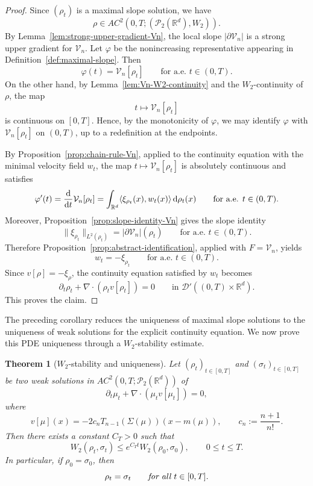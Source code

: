 \documentclass[11pt,reqno]{amsart}
\numberwithin{figure}{section}
\def\d {{\partial}}
\def\d{\mathrm{d}}
\renewcommand{\d}{  {\textup{d}} }
\newtheorem{theorem}{Theorem}[section]
\begin{document}
\begin{proof}
	Since $(\rho_t)$ is a maximal slope solution, we have
	\[
	\rho\in AC^2(0,T;(\mathcal P_2(\mathbb R^d),W_2)).
	\]
	By Lemma~\ref{lem:strong-upper-gradient-Vn}, the local slope
	$|\partial \mathcal V_n|$ is a strong upper gradient for $\mathcal V_n$.
	Let $\varphi$ be the nonincreasing representative appearing in
	Definition~\ref{def:maximal-slope}. Then
	\[
	\varphi(t)=\mathcal V_n[\rho_t]
	\qquad\text{for a.e. }t\in(0,T).
	\]
	On the other hand, by Lemma~\ref{lem:Vn-W2-continuity} and the
	$W_2$-continuity of $\rho$, the map
	\[
	t\longmapsto \mathcal V_n[\rho_t]
	\]
	is continuous on $[0,T]$. Hence, by the monotonicity of $\varphi$, we may
	identify $\varphi$ with $\mathcal V_n[\rho_t]$ on $(0,T)$, up to a redefinition at the endpoints.

	By Proposition~\ref{prop:chain-rule-Vn}, applied to the continuity equation
	with the minimal velocity field $w_t$, the map
	$t\mapsto \mathcal V_n[\rho_t]$ is absolutely continuous and satisfies
	\[
	\varphi'(t)
	=
	\frac{\d}{\d t}\mathcal V_n[\rho_t]
	=
	\int_{\mathbb R^d}
	\langle \xi_{\rho_t}(x),w_t(x)\rangle\,\d\rho_t(x)
	\qquad\text{for a.e. }t\in(0,T).
	\]
	Moreover, Proposition~\ref{prop:slope-identity-Vn} gives the slope identity
	\[
	\|\xi_{\rho_t}\|_{L^2(\rho_t)}
	=
	|\partial \mathcal V_n|(\rho_t)
	\qquad\text{for a.e. }t\in(0,T).
	\]
	Therefore Proposition~\ref{prop:abstract-identification}, applied with
	$F=\mathcal V_n$, yields
	\[
	w_t=-\xi_{\rho_t}
	\qquad\text{for a.e. }t\in(0,T).
	\]
	Since $v[\rho]=-\xi_\rho$, the continuity equation satisfied by $w_t$
	becomes
	\[
	\partial_t\rho_t+\nabla\cdot(\rho_t v[\rho_t])=0
	\qquad\text{in }\mathcal D'((0,T)\times\mathbb R^d).
	\]
	This proves the claim.
\end{proof}

The preceding corollary reduces the uniqueness of maximal slope solutions to
the uniqueness of weak solutions for the explicit continuity equation. We now
prove this PDE uniqueness through a $W_2$-stability estimate.


\begin{theorem}[$W_2$-stability and uniqueness]\label{thm:W2-stability-uniqueness}
Let $(\rho_t)_{t\in[0,T]}$ and $(\sigma_t)_{t\in[0,T]}$ be two weak solutions in
$AC^2(0,T;\mathcal P_2(\mathbb R^d))$ of
\[
\partial_t\mu_t+\nabla\cdot(\mu_t v[\mu_t])=0,
\]
where
\[
v[\mu](x)
=
-2c_nT_{n-1}(\Sigma(\mu))(x-m(\mu)),
\qquad
c_n:=\frac{n+1}{n!}.
\]
Then there exists a constant $C_T>0$ such that
\[
W_2(\rho_t,\sigma_t)
\le
e^{C_Tt}W_2(\rho_0,\sigma_0),
\qquad
0\le t\le T.
\]
In particular, if $\rho_0=\sigma_0$, then
\[
\rho_t=\sigma_t
\qquad\emph{for all }t\in[0,T].
\]
\end{theorem}
\end{document}
